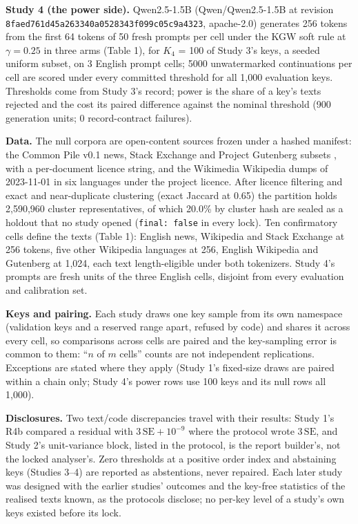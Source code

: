 \documentclass[11pt,letterpaper]{article}
\begin{document}
\textbf{Study 4 (the power side).} Qwen2.5-1.5B (Qwen/Qwen2.5-1.5B at revision \texttt{8fae\allowbreak{}d761\allowbreak{}d45a\allowbreak{}2633\allowbreak{}40a0\allowbreak{}5283\allowbreak{}43f0\allowbreak{}99c0\allowbreak{}5c9a\allowbreak{}4323}, apache-2.0) generates 256 tokens from the first 64 tokens of 50 fresh prompts per cell under the KGW soft rule at \(\gamma = 0.25\) in three arms (Table 1), for \(K_4\) = 100 of Study 3's keys, a seeded uniform subset, on 3 English prompt cells; 5000 unwatermarked continuations per cell are scored under every committed threshold for all 1,000 evaluation keys. Thresholds come from Study 3's record; power is the share of a key's texts rejected and the cost its paired difference against the nominal threshold (900 generation units; 0 record-contract failures).

\textbf{Data.} The null corpora are open-content sources frozen under a hashed manifest: the Common Pile v0.1 news, Stack Exchange and Project Gutenberg subsets \citep{kandpal2025commonpile}, with a per-document licence string, and the Wikimedia Wikipedia dumps of 2023-11-01 in six languages under the project licence. After licence filtering and exact and near-duplicate clustering (exact Jaccard at 0.65) the partition holds 2,590,960 cluster representatives, of which 20.0\% by cluster hash are sealed as a holdout that no study opened (\texttt{final:\ false} in every lock). Ten confirmatory cells define the texts (Table 1): English news, Wikipedia and Stack Exchange at 256 tokens, five other Wikipedia languages at 256, English Wikipedia and Gutenberg at 1,024, each text length-eligible under both tokenizers. Study 4's prompts are fresh units of the three English cells, disjoint from every evaluation and calibration set.

\textbf{Keys and pairing.} Each study draws one key sample from its own namespace (validation keys and a reserved range apart, refused by code) and shares it across every cell, so comparisons across cells are paired and the key-sampling error is common to them: ``\(n\) of \(m\) cells'' counts are not independent replications. Exceptions are stated where they apply (Study 1's fixed-size draws are paired within a chain only; Study 4's power rows use 100 keys and its null rows all 1,000).

\textbf{Disclosures.} Two text/code discrepancies travel with their results: Study 1's R4b compared a residual with \(3\,\mathrm{SE} + 10^{-9}\) where the protocol wrote \(3\,\mathrm{SE}\), and Study 2's unit-variance block, listed in the protocol, is the report builder's, not the locked analyser's. Zero thresholds at a positive order index and abstaining keys (Studies 3--4) are reported as abstentions, never repaired. Each later study was designed with the earlier studies' outcomes and the key-free statistics of the realised texts known, as the protocols disclose; no per-key level of a study's own keys existed before its lock.
\end{document}
